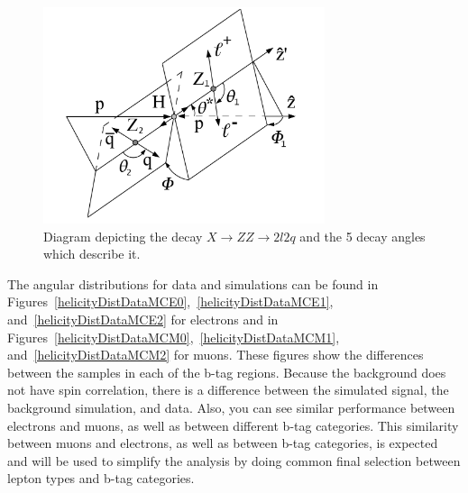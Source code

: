 \begin{figure}[htb!]
\centerline{
\includegraphics[height=2.5in]{plots/angles-HZZ2l2q}
}
\caption{Diagram depicting the decay $X\rightarrow ZZ\rightarrow 2l2q$ and the 5 decay angles which describe it.
\label{fig:decay}}
\end{figure}


The angular distributions for data and simulations can be found in Figures~\ref{helicityDistDataMCE0},~\ref{helicityDistDataMCE1}, and~\ref{helicityDistDataMCE2} for electrons and in Figures~\ref{helicityDistDataMCM0},~\ref{helicityDistDataMCM1}, and~\ref{helicityDistDataMCM2} for muons.  These figures show the differences between the samples in each of the b-tag regions.  Because the background does not have spin correlation, there is a difference between the simulated signal, the background simulation, and data.  Also, you can see similar performance between electrons and muons, as well as between different b-tag categories.  This similarity between muons and electrons, as well as between b-tag categories, is expected and will be used to simplify the analysis by doing common final selection between lepton types and b-tag categories.


